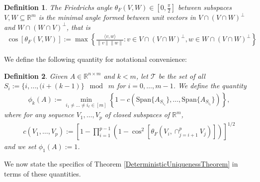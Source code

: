 \documentclass[journal, onecolumn]{IEEEtran}
\newtheorem{definition}{Definition}
\begin{document}
\begin{definition}\label{FriedrichsDefinition}
The \emph{Friedrichs angle} $\theta_F(V,W) \in [0,\frac{\pi}{2}]$ between subspaces $V,W \subseteq \mathbb{R}^m$ is the minimal angle formed between unit vectors in $V \cap (V \cap W)^\perp$ and $W \cap (W \cap V)^\perp$, that is
\begin{align}
\cos\left[\theta_F(V,W)\right] := \max\left\{ \frac{ \langle v, w \rangle }{\|v\|\|w\|}: v \in V \cap (V \cap W)^\perp, w \in W \cap (V \cap W)^\perp \right\}
\end{align}
\end{definition}

We define the following quantity for notational convenience:

\begin{definition}\label{SpecialSupportSet}
Given $A \in \mathbb{R}^{n \times m}$ and $k < m$, let $\mathcal{T}$ be the set of all $S_i := \{i, \ldots, (i + (k-1) \} \;\bmod\; m$ for $i = 0, \ldots, m-1$. We define the quantity
\begin{align}\label{rho}
\phi_k(A) := \min_{ i_1 \neq \ldots \neq i_{\ell} \in [m]} \left\{ 1 - c(\text{Span}\{A_{S_{i_1}}\}, \ldots, \text{Span}\{A_{S_{i_\ell}}\}) \right\},
\end{align}
where for any sequence $V_1, \ldots, V_p$ of closed subspaces of $\mathbb{R}^m$,
\begin{align}
c(V_1, \ldots, V_p) := \left[1 - \prod_{i=1}^{p-1} \left(1 - \cos^2\left[ \theta_F(V_i, \cap_{j=i+1}^p V_j) \right] \right) \right]^{1/2} 
\end{align}
%
and we set $\phi_1(A) := 1$.
\end{definition}

We now state the specifics of Theorem \ref{DeterministicUniquenessTheorem} in terms of these quantities.

\end{document}
